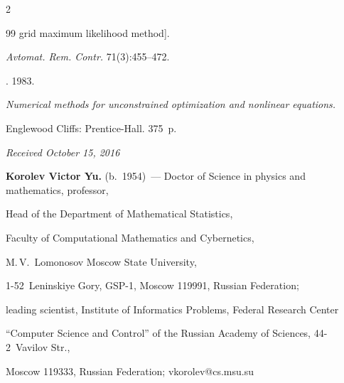 \begin{multicols}{2}
{{\begin{thebibliography}{99}
grid maximum likelihood method].


    \textit{Avtomat. Rem. Contr.} 71(3):455--472.


    




    . 1983.


    \textit{Numerical methods for unconstrained optimization and nonlinear equations.} 


    Englewood Cliffs:     Prentice-Hall. 375~p.


    \end{thebibliography}





 }


 }





\end{multicols}





\vspace*{-3pt}





\hfill{\small\textit{Received October 15, 2016}}





\Contr








\noindent


\textbf{Korolev Victor Yu.} (b.\ 1954)~--- Doctor of Science in physics and mathematics, professor, 


Head of the Department of Mathematical Statistics, 


Faculty of Computational Mathematics and Cybernetics, 


M.\,V.~Lomonosov Moscow State University, 


1-52~Leninskiye Gory, GSP-1, Moscow 119991, Russian Federation; 


leading scientist, Institute of Informatics Problems, Federal Research Center 


``Computer Science and Control'' of the Russian Academy of Sciences, 44-2~Vavilov Str., 


Moscow 119333,  Russian Federation; \mbox{vkorolev@cs.msu.su} 





